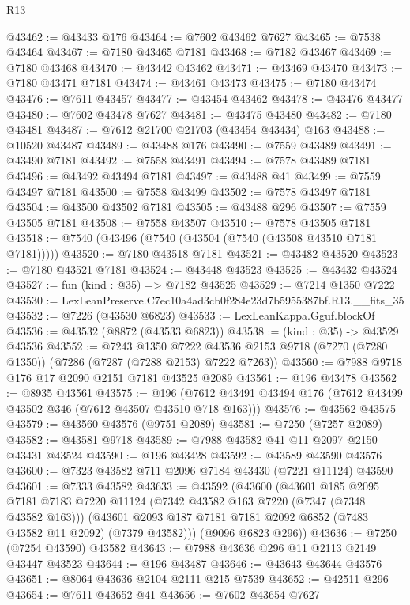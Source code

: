 \begin{lexlean}{R13}
\begin{coremodule}
@43462 := @43433 @176
@43464 := @7602 @43462 @7627
@43465 := @7538 @43464
@43467 := @7180 @43465 @7181
@43468 := @7182 @43467
@43469 := @7180 @43468
@43470 := @43442 @43462
@43471 := @43469 @43470
@43473 := @7180 @43471 @7181
@43474 := @43461 @43473
@43475 := @7180 @43474
@43476 := @7611 @43457
@43477 := @43454 @43462
@43478 := @43476 @43477
@43480 := @7602 @43478 @7627
@43481 := @43475 @43480
@43482 := @7180 @43481
@43487 := @7612 @21700 @21703 (@43454 @43434) @163
@43488 := @10520 @43487
@43489 := @43488 @176
@43490 := @7559 @43489
@43491 := @43490 @7181
@43492 := @7558 @43491
@43494 := @7578 @43489 @7181
@43496 := @43492 @43494 @7181
@43497 := @43488 @41
@43499 := @7559 @43497 @7181
@43500 := @7558 @43499
@43502 := @7578 @43497 @7181
@43504 := @43500 @43502 @7181
@43505 := @43488 @296
@43507 := @7559 @43505 @7181
@43508 := @7558 @43507
@43510 := @7578 @43505 @7181
@43518 := @7540 (@43496 (@7540 (@43504 (@7540 (@43508 @43510 @7181 @7181)))))
@43520 := @7180 @43518 @7181
@43521 := @43482 @43520
@43523 := @7180 @43521 @7181
@43524 := @43448 @43523
@43525 := @43432 @43524
@43527 := fun (kind : @35) => @7182 @43525
@43529 := @7214 @1350 @7222
@43530 := LexLeanPreserve.C7ec10a4ad3cb0f284e23d7b5955387bf.R13.__fits_35
@43532 := @7226 (@43530 @6823)
@43533 := LexLeanKappa.Gguf.blockOf
@43536 := @43532 (@8872 (@43533 @6823))
@43538 := (kind : @35) -> @43529 @43536
@43552 := @7243
    @1350
    @7222
    @43536
    @2153
    @9718
    (@7270 (@7280 @1350))
    (@7286 (@7287 (@7288 @2153) @7222 @7263))
@43560 := @7988 @9718 @176 @17 @2090 @2151 @7181 @43525 @2089
@43561 := @196 @43478
@43562 := @8935 @43561
@43575 := @196 (@7612 @43491 @43494 @176 (@7612 @43499 @43502 @346 (@7612 @43507 @43510 @718 @163)))
@43576 := @43562 @43575
@43579 := @43560 @43576 (@9751 @2089)
@43581 := @7250 (@7257 @2089)
@43582 := @43581 @9718
@43589 := @7988 @43582 @41 @11 @2097 @2150 @43431 @43524
@43590 := @196 @43428
@43592 := @43589 @43590 @43576
@43600 := @7323 @43582 @711 @2096 @7184 @43430 (@7221 @11124) @43590
@43601 := @7333 @43582
@43633 := @43592
    (@43600
      (@43601
        @185
        @2095
        @7181
        @7183
        @7220
        @11124
        (@7342 @43582 @163 @7220 (@7347 (@7348 @43582 @163)))
        (@43601 @2093 @187 @7181 @7181 @2092 @6852 (@7483 @43582 @11 @2092) (@7379 @43582)))
      (@9096 @6823 @296))
@43636 := @7250 (@7254 @43590) @43582
@43643 := @7988 @43636 @296 @11 @2113 @2149 @43447 @43523
@43644 := @196 @43487
@43646 := @43643 @43644 @43576
@43651 := @8064 @43636 @2104 @2111 @215 @7539
@43652 := @42511 @296
@43654 := @7611 @43652 @41
@43656 := @7602 @43654 @7627

\end{coremodule}
\end{lexlean}
